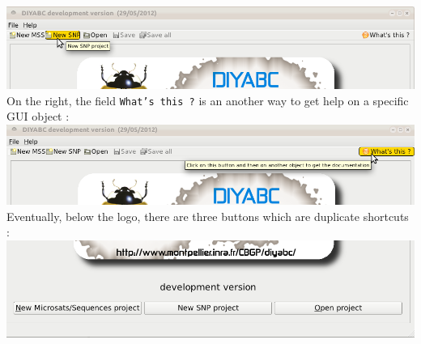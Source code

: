 \includegraphics[scale=0.4]{gui_pictures/Capture-DIYABC-4}\\


On the right, the field \texttt{What's this ?} is an another way to
get help on a specific GUI object :\\


\includegraphics[scale=0.4]{gui_pictures/Capture-DIYABC-5}\\


Eventually, below the logo, there are three buttons which are duplicate
shortcuts :\\


\includegraphics[scale=0.4]{gui_pictures/Capture-DIYABC-6}\\












